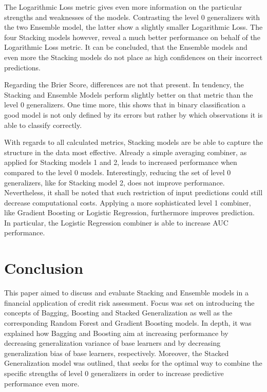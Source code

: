 \documentclass[12pt]{article}
\begin{document}
The Logarithmic Loss metric gives even more information on the particular strengths and weaknesses of the models. Contrasting the level 0 generalizers with the two Ensemble model, the latter show a slightly smaller Logarithmic Loss. The four Stacking models however, reveal a much better performance on behalf of the Logarithmic Loss metric. It can be concluded, that the Ensemble models and even more the Stacking models do not place as high confidences on their incorrect predictions. 

Regarding the Brier Score, differences are not that present. In tendency, the Stacking and Ensemble Models perform slightly better on that metric than the level 0 generalizers. One time more, this shows that in binary classification a good model is not only defined by its errors but rather by which observations it is able to classify correctly.

With regards to all calculated metrics, Stacking models are be able to capture the structure in the data most effective. Already a simple averaging combiner, as applied for Stacking models 1 and 2, leads to increased performance when compared to the level 0 models. Interestingly, reducing the set of level 0 generalizers, like for Stacking model 2, does not improve performance. Nevertheless, it shall be noted that such restriction of input predictions could still decrease computational costs. Applying a more sophisticated level 1 combiner, like Gradient Boosting or Logistic Regression, furthermore improves prediction. In particular, the Logistic Regression combiner is able to increase AUC performance. 



\section{Conclusion}
This paper aimed to discuss and evaluate Stacking and Ensemble models in a financial application of credit risk assessment. Focus was set on introducing the concepts of Bagging, Boosting and Stacked Generalization as well as the corresponding Random Forest and Gradient Boosting models. In depth, it was explained how Bagging and Boosting aim at increasing performance by decreasing generalization variance of base learners and by decreasing generalization bias of base learners, respectively. Moreover, the Stacked Generalization model was outlined, that seeks for the optimal way to combine the specific strengths of level 0 generalizers in order to increase predictive performance even more.
\end{document}
